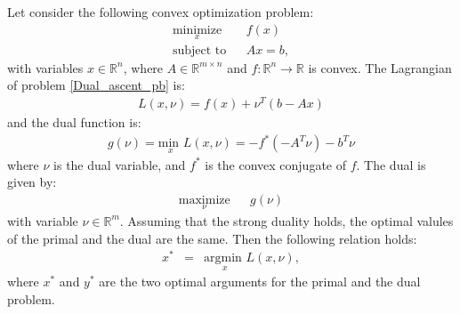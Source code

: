 \documentclass{article}
\begin{document}
	Let consider the following convex optimization problem:
\begin{eqnarray}
\label{Dual_ascent_pb}
\underset{x}{\text{minimize}} & & f(x) \\
\text{subject to} & & Ax = b, \nonumber
\end{eqnarray}
with variables $x \in \mathbb{R}^n$, where $A \in \mathbb{R}^{m \times n}$ and $ f : \mathbb{R}^n \to \mathbb{R}$ is convex. 
The Lagrangian of problem \ref{Dual_ascent_pb} is:
\begin{eqnarray*}
\label{Dual_ascent_Lag}
L(x,\nu) = f(x) + \nu^T (b - Ax)
\end{eqnarray*}
and the dual function is:
\begin{eqnarray*}
g(\nu) = \underset{x}{\text{min }} L(x, \nu) = - f^{*}(-A^T \nu) - b^T \nu
\end{eqnarray*}
where $\nu $ is the dual variable, and $f^*$ is the convex conjugate of $f$. The dual is given by:
\begin{eqnarray*}
\underset{\nu}{\text{maximize}} & & g(\nu)
\end{eqnarray*}
with variable $\nu \in \mathbb{R}^m$. Assuming that the strong duality holds, the optimal valules of the primal and the dual are the same. Then the following relation holds:
\begin{eqnarray*}
x^* &=& \underset{x}{\text{argmin }} L(x, \nu),
\end{eqnarray*}
where $x^*$ and $y^*$ are the two optimal arguments for the primal and the dual problem.
\end{document}
